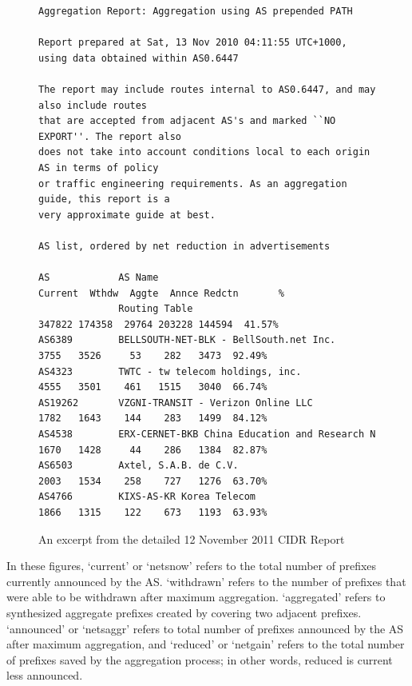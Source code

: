 \begin{figure}
\begin{lstlisting}[frame=trlb]
Aggregation Report: Aggregation using AS prepended PATH

Report prepared at Sat, 13 Nov 2010 04:11:55 UTC+1000, using data obtained within AS0.6447

The report may include routes internal to AS0.6447, and may also include routes
that are accepted from adjacent AS's and marked ``NO EXPORT''. The report also
does not take into account conditions local to each origin AS in terms of policy
or traffic engineering requirements. As an aggregation guide, this report is a
very approximate guide at best.

AS list, ordered by net reduction in advertisements

AS            AS Name                                      Current  Wthdw  Aggte  Annce Redctn       %
              Routing Table                                 347822 174358  29764 203228 144594  41.57%
AS6389        BELLSOUTH-NET-BLK - BellSouth.net Inc.          3755   3526     53    282   3473  92.49%
AS4323        TWTC - tw telecom holdings, inc.                4555   3501    461   1515   3040  66.74%
AS19262       VZGNI-TRANSIT - Verizon Online LLC              1782   1643    144    283   1499  84.12%
AS4538        ERX-CERNET-BKB China Education and Research N   1670   1428     44    286   1384  82.87%
AS6503        Axtel, S.A.B. de C.V.                           2003   1534    258    727   1276  63.70%
AS4766        KIXS-AS-KR Korea Telecom                        1866   1315    122    673   1193  63.93%
\end{lstlisting}
\caption{An excerpt from the detailed 12 November 2011 CIDR Report}
\label{fig:ex_cidr_report_detail}
\end{figure}

In these figures, `current' or `netsnow' refers to the total number of prefixes
currently announced by the AS. `withdrawn' refers to the number of prefixes
that were able to be withdrawn after maximum aggregation. `aggregated' refers
to synthesized aggregate prefixes created by covering two adjacent prefixes.
`announced' or `netsaggr' refers to total number of prefixes announced by the
AS after maximum aggregation, and `reduced' or `netgain' refers to the total
number of prefixes saved by the aggregation process; in other words, reduced is
current less announced.



